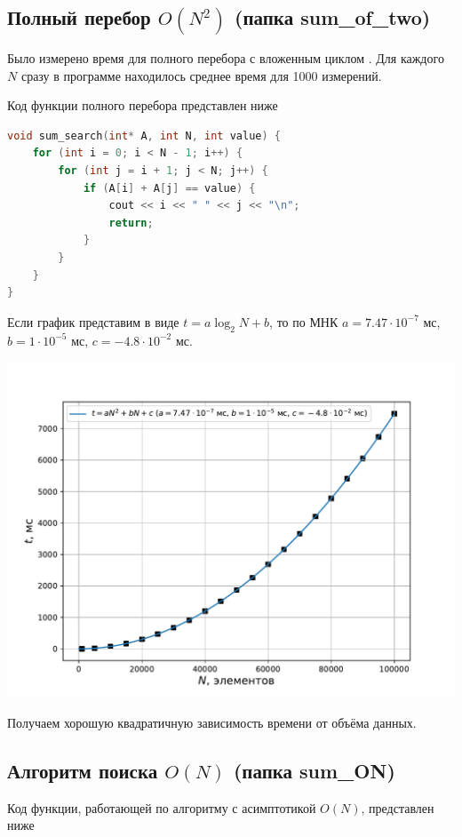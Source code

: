 \documentclass[a4paper,12pt]{article}
\begin{document}
\subsection*{Полный перебор $O(N^2)$ (папка sum\_of\_two)}
Было измерено время для полного перебора с вложенным циклом . Для каждого $N$ сразу в программе находилось среднее время для 1000 измерений.

Код функции полного перебора представлен ниже
\begin{lstlisting}[language=C++]
void sum_search(int* A, int N, int value) {
	for (int i = 0; i < N - 1; i++) {
		for (int j = i + 1; j < N; j++) {
			if (A[i] + A[j] == value) {
				cout << i << " " << j << "\n";
				return;
			}
		}
	}
}
\end{lstlisting}

Если график представим в виде $t = a \log_2 N + b$,  то по МНК $a = 7.47 \cdot 10^{-7}$ мс, $b = 1 \cdot 10^{-5}$ мс, $c = -4.8 \cdot 10^{-2}$ мс.

\begin{center}
\includegraphics[scale=1]{Figure_3.pdf}
\end{center}

Получаем хорошую квадратичную зависимость времени от объёма данных.

\subsection*{Алгоритм поиска $O(N)$ (папка sum\_ON)}

Код функции, работающей по алгоритму с асимптотикой $O(N)$, представлен ниже
\end{document}
